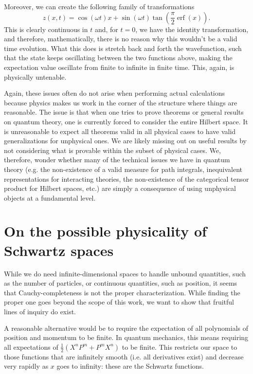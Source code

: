 \documentclass[10pt,twocolumn, nofootinbib]{revtex4-2}
\DeclareMathOperator{\erf}{erf}
\begin{document}
Moreover, we can create the following family of transformations
\begin{equation}
z(x, t) = \cos(\omega t) x + \sin(\omega t) \tan \left(\frac{\pi}{2}\erf(x)\right).
\end{equation}
This is clearly continuous in $t$ and, for $t=0$, we have the identity transformation, and therefore, mathematically, there is no reason why this wouldn't be a valid time evolution. What this does is stretch back and forth the wavefunction, such that the state keeps oscillating between the two functions above, making the expectation value oscillate from finite to infinite in finite time. This, again, is physically untenable.

Again, these issues often do not arise when performing actual calculations because physics makes us work in the corner of the structure where things are reasonable. The issue is that when one tries to prove theorems or general results on quantum theory, one is currently forced to consider the entire Hilbert space. It is unreasonable to expect all theorems valid in all physical cases to have valid generalizations for unphysical ones. We are likely missing out on useful results by not considering what is provable within the subset of physical cases. We, therefore, wonder whether many of the technical issues we have in quantum theory (e.g. the non-existence of a valid measure for path integrals\cite{glimm_quantum_1987}, inequivalent representations for interacting theories\cite{earman_haags_2006}, the non-existence of the categorical tensor product for Hilbert spaces\cite{garrett_tensor_2010, sorkin_inside_2022}, etc.)  are simply a consequence of using unphysical objects at a fundamental level.

\section{On the possible physicality of Schwartz spaces}

While we do need infinite-dimensional spaces to handle unbound quantities, such as the number of particles, or continuous quantities, such as position, it seems that Cauchy-completeness is not the proper characterization. While finding the proper one goes beyond the scope of this work, we want to show that fruitful lines of inquiry do exist.

A reasonable alternative would be to require the expectation of all polynomials of position and momentum to be finite. In quantum mechanics, this means requiring all expectations of $\frac{1}{2}(X^nP^m + P^mX^n)$ to be finite. This restricts our space to those functions that are infinitely smooth (i.e. all derivatives exist) and decrease very rapidly as $x$ goes to infinity: these are the Schwartz functions.
\end{document}
